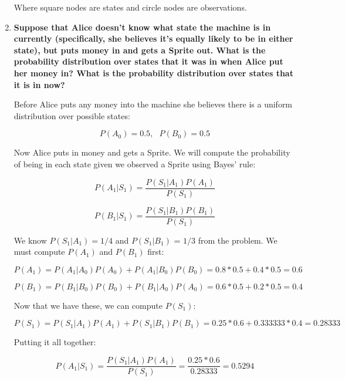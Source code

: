 \documentclass[fleqn]{hermans-hw}
\begin{document}
\begin{enumerate}

Where square nodes are states and circle nodes are observations.

\item {\bf Suppose that Alice doesn't know what state the machine is in
  currently (specifically, she believes it's equally likely to be in
  either state), but puts money in and gets a Sprite out.  What is the
  probability distribution over states that it was in when Alice put
  her money in?  What is the probability distribution over states that
  it is in now?}
  
  Before Alice puts any money into the machine she believes there is a uniform distribution over possible states:
  
  $$\boxed{P(A_0) = 0.5, \ \ \ P(B_0) = 0.5}$$
  
  Now Alice puts in money and gets a Sprite. We will compute the probability of being in each state given we observed a Sprite using Bayes' rule:
  
  $$P(A_1 | S_1) = \frac{P(S_1 | A_1) P(A_1)}{P(S_1)}$$
  
  $$P(B_1 | S_1) = \frac{P(S_1 | B_1) P(B_1)}{P(S_1)}$$
  
  We know $P(S_1 | A_1) = 1/4$ and $P(S_1 | B_1)$ = $1/3$ from the problem. We must compute $P(A_1)$ and $P(B_1)$ first:
  
  $$P(A_1) = P(A_1 | A_0)P(A_0) + P(A_1 | B_0)P(B_0) = 0.8 * 0.5 + 0.4 * 0.5 = 0.6$$
  
  $$P(B_1) = P(B_1 | B_0)P(B_0) + P(B_1 | A_0)P(A_0) = 0.6 * 0.5 + 0.2 * 0.5 = 0.4$$
  
  Now that we have these, we can compute $P(S_1)$:
  
  $$P(S_1) = P(S_1 | A_1)P(A_1) + P(S_1 | B_1)P(B_1) = 0.25 * 0.6 + 0.333333 * 0.4 = 0.28333$$
  
  Putting it all together:
  
  $$P(A_1 | S_1) = \frac{P(S_1 | A_1) P(A_1)}{P(S_1)} = \frac{0.25 * 0.6}{0.28333} = 0.5294$$
  

\end{enumerate}
\end{document}
